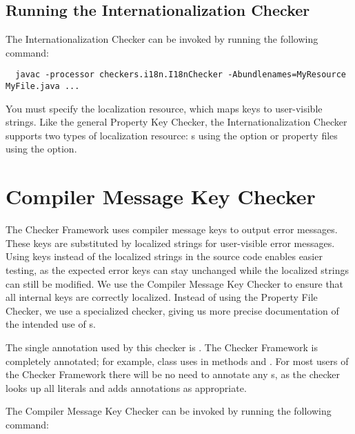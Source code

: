 \subsection{Running the Internationalization Checker\label{i18n-running}}

The Internationalization Checker can be invoked by running the following
command:

\begin{Verbatim}
  javac -processor checkers.i18n.I18nChecker -Abundlenames=MyResource MyFile.java ...
\end{Verbatim}

You must specify the localization resource, which maps keys to user-visible
strings.  Like the general Property Key Checker, the Internationalization Checker
supports two types of localization resource:
s using the 
 option
or property files using the
 option.



\section{Compiler Message Key Checker\label{compilermsgs-checker}}

The Checker Framework uses compiler message keys to output error messages.
These keys are substituted by localized strings for user-visible error messages.
Using keys instead of the localized strings in the source code enables easier
testing, as the expected error keys can stay unchanged while the localized
strings can still be modified. 
We use the Compiler Message Key Checker to ensure that all internal
keys are correctly localized.
Instead of using the Property File Checker, we use a specialized checker,
giving us more precise documentation of the intended use of s.

The single annotation used by this checker is 
.
The Checker Framework is completely annotated;
for example, class 
uses  in methods  and .
For most users of the Checker Framework there will be no need to annotate any
s, as the checker looks up all  literals and adds
annotations as appropriate.

The Compiler Message Key Checker can be invoked by running the following
command:

